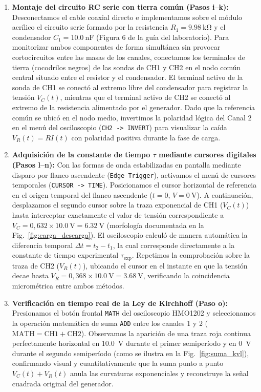 \begin{enumerate}
    \item \textbf{Montaje del circuito RC serie con tierra común (Pasos i--k):} Desconectamos el cable coaxial directo e implementamos sobre el módulo acrílico el circuito serie formado por la resistencia $R_1 = \qty{9,98}{\kilo\ohm}$ y el condensador $C_1 = \qty{10,0}{\nano\farad}$ (Figura 6 de la guía del laboratorio). Para monitorizar ambos componentes de forma simultánea sin provocar cortocircuitos entre las masas de los canales, conectamos los terminales de tierra (cocodrilos negros) de las sondas de CH1 y CH2 en el nodo común central situado entre el resistor y el condensador. El terminal activo de la sonda de CH1 se conectó al extremo libre del condensador para registrar la tensión $V_C(t)$, mientras que el terminal activo de CH2 se conectó al extremo de la resistencia alimentado por el generador. Dado que la referencia común se ubicó en el nodo medio, invertimos la polaridad lógica del Canal 2 en el menú del osciloscopio (\texttt{CH2 -> INVERT}) para visualizar la caída $V_R(t) = R I(t)$ con polaridad positiva durante la fase de carga.
    
    \item \textbf{Adquisición de la constante de tiempo $\tau$ mediante cursores digitales (Pasos l--n):} Con las formas de onda estabilizadas en pantalla mediante disparo por flanco ascendente (\texttt{Edge Trigger}), activamos el menú de cursores temporales (\texttt{CURSOR -> TIME}). Posicionamos el cursor horizontal de referencia en el origen temporal del flanco ascendente ($t = 0$, $V = \qty{0}{\volt}$). A continuación, desplazamos el segundo cursor sobre la traza exponencial de CH1 ($V_C(t)$) hasta interceptar exactamente el valor de tensión correspondiente a $V_C = 0{,}632 \times \qty{10,0}{\volt} = \qty{6,32}{\volt}$ (morfología documentada en la Fig.~\ref{fig:carga_descarga}). El osciloscopio calculó de manera automática la diferencia temporal $\Delta t = t_2 - t_1$, la cual corresponde directamente a la constante de tiempo experimental $\tau_{\text{exp}}$. Repetimos la comprobación sobre la traza de CH2 ($V_R(t)$), ubicando el cursor en el instante en que la tensión decae hasta $V_R = 0{,}368 \times \qty{10,0}{\volt} = \qty{3,68}{\volt}$, verificando la coincidencia micrométrica entre ambos métodos.
    
    \item \textbf{Verificación en tiempo real de la Ley de Kirchhoff (Paso o):} Presionamos el botón frontal \texttt{MATH} del osciloscopio HMO1202 y seleccionamos la operación matemática de suma \texttt{ADD} entre los canales 1 y 2 ($\text{MATH} = \text{CH1} + \text{CH2}$). Observamos la aparición de una traza roja continua perfectamente horizontal en \qty{10,0}{\volt} durante el primer semiperíodo y en \qty{0}{\volt} durante el segundo semiperíodo (como se ilustra en la Fig.~\ref{fig:suma_kvl}), confirmando visual y cuantitativamente que la suma punto a punto $V_C(t) + V_R(t)$ anula las curvaturas exponenciales y reconstruye la señal cuadrada original del generador.
    

\end{enumerate}
